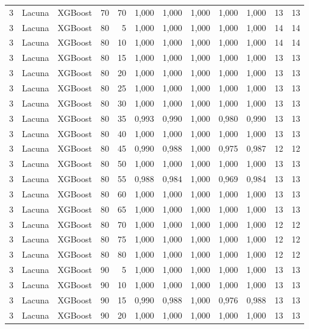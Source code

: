 \begin{longtable}{@{}rllrrrrrrrrr@{}}
3 & Lacuna & XGBoost & 70 & 70 & 1,000 & 1,000 & 1,000 & 1,000 & 1,000 & 13 & 13 \\
3 & Lacuna & XGBoost & 80 & 5 & 1,000 & 1,000 & 1,000 & 1,000 & 1,000 & 14 & 14 \\
3 & Lacuna & XGBoost & 80 & 10 & 1,000 & 1,000 & 1,000 & 1,000 & 1,000 & 14 & 14 \\
3 & Lacuna & XGBoost & 80 & 15 & 1,000 & 1,000 & 1,000 & 1,000 & 1,000 & 13 & 13 \\
3 & Lacuna & XGBoost & 80 & 20 & 1,000 & 1,000 & 1,000 & 1,000 & 1,000 & 13 & 13 \\
3 & Lacuna & XGBoost & 80 & 25 & 1,000 & 1,000 & 1,000 & 1,000 & 1,000 & 13 & 13 \\
3 & Lacuna & XGBoost & 80 & 30 & 1,000 & 1,000 & 1,000 & 1,000 & 1,000 & 13 & 13 \\
3 & Lacuna & XGBoost & 80 & 35 & 0,993 & 0,990 & 1,000 & 0,980 & 0,990 & 13 & 13 \\
3 & Lacuna & XGBoost & 80 & 40 & 1,000 & 1,000 & 1,000 & 1,000 & 1,000 & 13 & 13 \\
3 & Lacuna & XGBoost & 80 & 45 & 0,990 & 0,988 & 1,000 & 0,975 & 0,987 & 12 & 12 \\
3 & Lacuna & XGBoost & 80 & 50 & 1,000 & 1,000 & 1,000 & 1,000 & 1,000 & 13 & 13 \\
3 & Lacuna & XGBoost & 80 & 55 & 0,988 & 0,984 & 1,000 & 0,969 & 0,984 & 13 & 13 \\
3 & Lacuna & XGBoost & 80 & 60 & 1,000 & 1,000 & 1,000 & 1,000 & 1,000 & 13 & 13 \\
3 & Lacuna & XGBoost & 80 & 65 & 1,000 & 1,000 & 1,000 & 1,000 & 1,000 & 13 & 13 \\
3 & Lacuna & XGBoost & 80 & 70 & 1,000 & 1,000 & 1,000 & 1,000 & 1,000 & 12 & 12 \\
3 & Lacuna & XGBoost & 80 & 75 & 1,000 & 1,000 & 1,000 & 1,000 & 1,000 & 12 & 12 \\
3 & Lacuna & XGBoost & 80 & 80 & 1,000 & 1,000 & 1,000 & 1,000 & 1,000 & 12 & 12 \\
3 & Lacuna & XGBoost & 90 & 5 & 1,000 & 1,000 & 1,000 & 1,000 & 1,000 & 13 & 13 \\
3 & Lacuna & XGBoost & 90 & 10 & 1,000 & 1,000 & 1,000 & 1,000 & 1,000 & 13 & 13 \\
3 & Lacuna & XGBoost & 90 & 15 & 0,990 & 0,988 & 1,000 & 0,976 & 0,988 & 13 & 13 \\
3 & Lacuna & XGBoost & 90 & 20 & 1,000 & 1,000 & 1,000 & 1,000 & 1,000 & 13 & 13 \\

\end{longtable}
